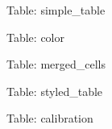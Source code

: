 \documentclass[12pt]{article}
\begin{document}
Table: simple\_table



\newpage
Table: color



\newpage
Table: merged\_cells



\newpage
Table: styled\_table



\newpage
Table: calibration


\end{document}
